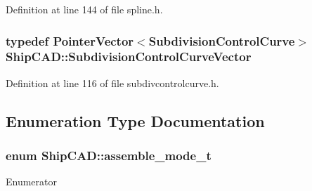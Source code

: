 Definition at line 144 of file spline.\-h.

\hypertarget{namespaceShipCAD_aa9dd7a826ae5254e377dac43ea19da80}{
\subsubsection[{Subdivision\-Control\-Curve\-Vector}]{\setlength{\rightskip}{0pt plus 5cm}typedef {\bf Pointer\-Vector}$<${\bf Subdivision\-Control\-Curve}$>$ {\bf Ship\-C\-A\-D\-::\-Subdivision\-Control\-Curve\-Vector}}}\label{namespaceShipCAD_aa9dd7a826ae5254e377dac43ea19da80}


Definition at line 116 of file subdivcontrolcurve.\-h.



\subsection{Enumeration Type Documentation}
\hypertarget{namespaceShipCAD_aaba70dc1c80dc540bef320cb9b720a20}{
\subsubsection[{assemble\-\_\-mode\-\_\-t}]{\setlength{\rightskip}{0pt plus 5cm}enum {\bf Ship\-C\-A\-D\-::assemble\-\_\-mode\-\_\-t}}}\label{namespaceShipCAD_aaba70dc1c80dc540bef320cb9b720a20}
\begin{Desc}
\item[Enumerator]\par
\begin{description}
\item[{\em 
\hypertarget{namespaceShipCAD_aaba70dc1c80dc540bef320cb9b720a20aeaaf4833473e9e7c408d2f02c7d112c6}{am\-Regular}\label{namespaceShipCAD_aaba70dc1c80dc540bef320cb9b720a20aeaaf4833473e9e7c408d2f02c7d112c6}
}]\item[{\em 
\hypertarget{namespaceShipCAD_aaba70dc1c80dc540bef320cb9b720a20a33b807b55bc385bc5d69ceb0d74d53fc}{am\-N\-U\-R\-B\-S}\label{namespaceShipCAD_aaba70dc1c80dc540bef320cb9b720a20a33b807b55bc385bc5d69ceb0d74d53fc}
}]\end{description}
\end{Desc}


